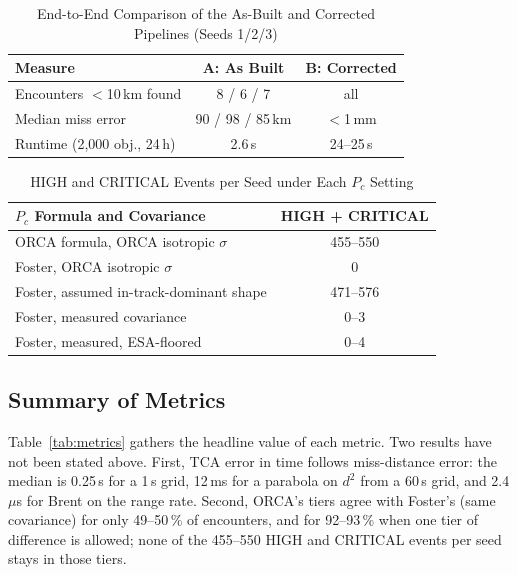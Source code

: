 \documentclass[conference]{IEEEtran}
\begin{document}
\begin{table}[t]
\caption{End-to-End Comparison of the As-Built and Corrected Pipelines (Seeds 1/2/3)}
\label{tab:e2e}
\centering
\footnotesize
\begin{tabular}{|l|c|c|}
\hline
\textbf{Measure} & \textbf{A: As Built} & \textbf{B: Corrected}\\
\hline
Encounters $<$10\,km found & 8 / 6 / 7 & all\\
\hline
Median miss error & 90 / 98 / 85\,km & $<$1\,mm\\
\hline
Runtime (2,000 obj., 24\,h) & 2.6\,s & 24--25\,s\\
\hline
\end{tabular}
\end{table}

\begin{table}[t]
\caption{HIGH and CRITICAL Events per Seed under Each $P_c$ Setting}
\label{tab:tiers}
\centering
\footnotesize
\begin{tabular}{|l|c|}
\hline
\textbf{$P_c$ Formula and Covariance} & \textbf{HIGH + CRITICAL}\\
\hline
ORCA formula, ORCA isotropic $\sigma$ & 455--550\\
\hline
Foster, ORCA isotropic $\sigma$ & 0\\
\hline
Foster, assumed in-track-dominant shape & 471--576\\
\hline
Foster, measured covariance & 0--3\\
\hline
Foster, measured, ESA-floored & 0--4\\
\hline
\end{tabular}
\end{table}

\subsection{Summary of Metrics}
Table~\ref{tab:metrics} gathers the headline value of each metric. Two results have not been stated above. First, TCA error in time follows miss-distance error: the median is 0.25\,s for a 1\,s grid, 12\,ms for a parabola on $d^2$ from a 60\,s grid, and 2.4\,$\mu$s for Brent on the range rate. Second, ORCA's tiers agree with Foster's (same covariance) for only 49--50\,\% of encounters, and for 92--93\,\% when one tier of difference is allowed; none of the 455--550 HIGH and CRITICAL events per seed stays in those tiers.
\end{document}
